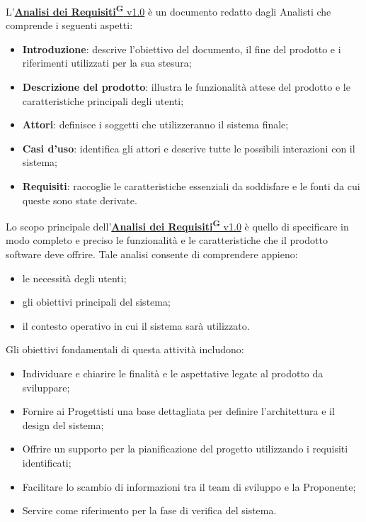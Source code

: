 L'\href{https://code7crusaders.github.io/docs/RTB/documentazione_interna/glossario.html#analisi-dei-requisiti}{\textbf{Analisi dei Requisiti\textsuperscript{G}} v1.0} è un documento redatto dagli Analisti che comprende i seguenti aspetti:
\begin{itemize}
    \item \textbf{Introduzione}: descrive l’obiettivo del documento, il fine del prodotto e i riferimenti utilizzati per la sua stesura;
    \item \textbf{Descrizione del prodotto}: illustra le funzionalità attese del prodotto e le caratteristiche principali degli utenti;
    \item \textbf{Attori}: definisce i soggetti che utilizzeranno il sistema finale;
    \item \textbf{Casi d’uso}: identifica gli attori e descrive tutte le possibili interazioni con il sistema;
    \item \textbf{Requisiti}: raccoglie le caratteristiche essenziali da soddisfare e le fonti da cui queste sono state derivate.
\end{itemize}

Lo scopo principale dell'\href{https://code7crusaders.github.io/docs/RTB/documentazione_interna/glossario.html#analisi-dei-requisiti}{\textbf{Analisi dei Requisiti\textsuperscript{G}} v1.0} è quello di specificare in modo completo e preciso le funzionalità e le caratteristiche che il prodotto software deve offrire. Tale analisi consente di comprendere appieno:
\begin{itemize}
    \item le necessità degli utenti;
    \item gli obiettivi principali del sistema;
    \item il contesto operativo in cui il sistema sarà utilizzato.
\end{itemize}

Gli obiettivi fondamentali di questa attività includono:
\begin{itemize}
    \item Individuare e chiarire le finalità e le aspettative legate al prodotto da sviluppare;
    \item Fornire ai Progettisti una base dettagliata per definire l’architettura e il design del sistema;
    \item Offrire un supporto per la pianificazione del progetto utilizzando i requisiti identificati;
    \item Facilitare lo scambio di informazioni tra il team di sviluppo e la Proponente;
    \item Servire come riferimento per la fase di verifica del sistema.
\end{itemize}


